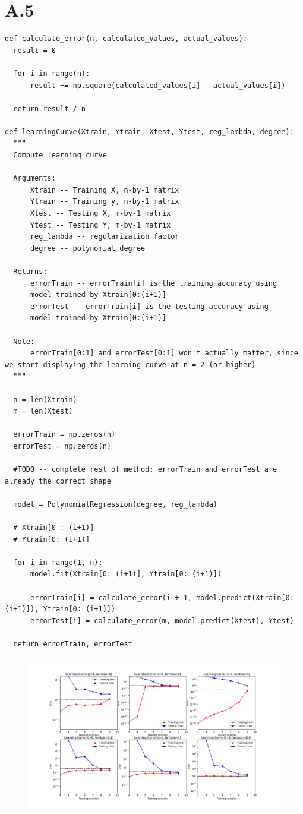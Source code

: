 \documentclass{article}
\newcommand{\1}{\mathbf{1}}
\begin{document}
\section*{A.5}
{\Large 

\begin{verbatim}
def calculate_error(n, calculated_values, actual_values):
  result = 0

  for i in range(n):
      result += np.square(calculated_values[i] - actual_values[i])

  return result / n

def learningCurve(Xtrain, Ytrain, Xtest, Ytest, reg_lambda, degree):
  """
  Compute learning curve

  Arguments:
      Xtrain -- Training X, n-by-1 matrix
      Ytrain -- Training y, n-by-1 matrix
      Xtest -- Testing X, m-by-1 matrix
      Ytest -- Testing Y, m-by-1 matrix
      reg_lambda -- regularization factor
      degree -- polynomial degree

  Returns:
      errorTrain -- errorTrain[i] is the training accuracy using
      model trained by Xtrain[0:(i+1)]
      errorTest -- errorTrain[i] is the testing accuracy using
      model trained by Xtrain[0:(i+1)]

  Note:
      errorTrain[0:1] and errorTest[0:1] won't actually matter, since we start displaying the learning curve at n = 2 (or higher)
  """

  n = len(Xtrain)
  m = len(Xtest)

  errorTrain = np.zeros(n)
  errorTest = np.zeros(n)

  #TODO -- complete rest of method; errorTrain and errorTest are already the correct shape

  model = PolynomialRegression(degree, reg_lambda)

  # Xtrain[0 : (i+1)]
  # Ytrain[0: (i+1)]

  for i in range(1, n):
      model.fit(Xtrain[0: (i+1)], Ytrain[0: (i+1)])

      errorTrain[i] = calculate_error(i + 1, model.predict(Xtrain[0: (i+1)]), Ytrain[0: (i+1)])
      errorTest[i] = calculate_error(m, model.predict(Xtest), Ytest)

  return errorTrain, errorTest
\end{verbatim}

\begin{figure}[ht!]
  \centering
  \includegraphics[width=215mm]{../hw1-code/results/a5.png}
\end{figure}

}
\end{document}
